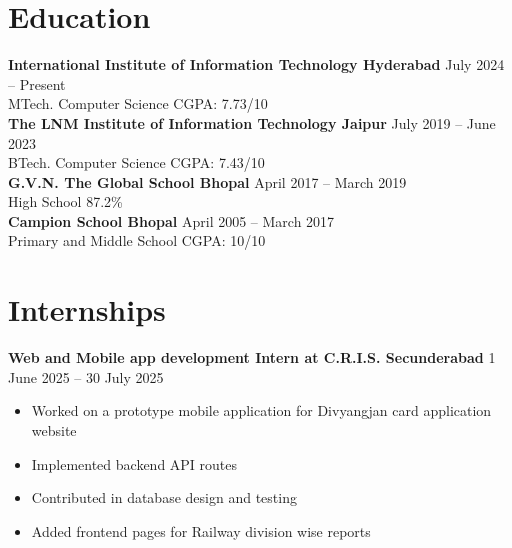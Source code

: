 \documentclass{article}
\begin{document}
\section*{Education}
\begin{flushleft}
	\noindent\large\textbf{International Institute of Information Technology Hyderabad} \hfill July 2024 -- Present \\
	MTech. Computer Science \hfill CGPA: 7.73/10\\
	\vspace{0.1cm}
	\noindent\large\textbf{The LNM Institute of Information Technology Jaipur} \hfill July 2019 -- June 2023 \\
	BTech. Computer Science \hfill CGPA: 7.43/10\\
	\vspace{0.1cm}
	\noindent\large\textbf{G.V.N. The Global School Bhopal} \hfill April 2017 -- March 2019 \\ High School \hfill 87.2\%\\
	\vspace{0.1cm}
	\noindent\large\textbf{Campion School Bhopal} \hfill April 2005 -- March 2017 \\ Primary and Middle School \hfill CGPA: 10/10\\
\end{flushleft}


\section*{Internships}

\noindent\large\textbf{Web and Mobile app development Intern at C.R.I.S. Secunderabad} \hfill 1 June 2025 -- 30 July 2025

\vspace{2pt}
\noindent{}

\begin{itemize}[leftmargin=15pt, topsep=0pt, itemsep=2pt]
	\item {\fontsize{11.5pt}{13.5pt}\selectfont Worked on a prototype mobile application for Divyangjan card application website}
	\item {\fontsize{11.5pt}{13.5pt}\selectfont Implemented backend API routes}
	\item {\fontsize{11.5pt}{13.5pt}\selectfont Contributed in database design and testing}
	\item {\fontsize{11.5pt}{13.5pt}\selectfont Added frontend pages for Railway division wise reports}
\end{itemize}
\end{document}
